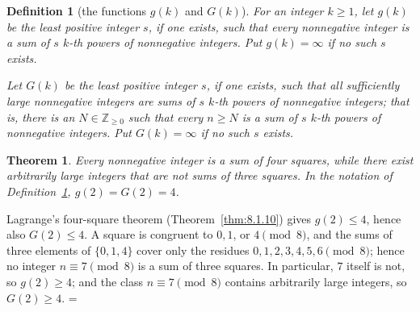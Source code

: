 \documentclass[11pt]{article}
\makeatletter
\theoremstyle{ntstyle}
\newtheorem{theorem}{Theorem}[subsection]
\newtheorem{definition}{Definition}[subsection]
\let\nt@closedisplay\]
\def\nt@guardedclose{\@ifnextchar\par{\nt@closeafterpar}{\@ifnextchar\end{\postdisplaypenalty\@M\nt@closedisplay}{\nt@closedisplay}}}
\def\nt@closeafterpar\par{\@ifnextchar\par{\nt@closeafterpar}{\@ifnextchar\end{\postdisplaypenalty\@M\nt@closedisplay\par}{\nt@closedisplay\par}}}
\renewenvironment{proof}[1][\proofname]{\par
  \pushQED{\qed}\normalfont\topsep\medskipamount\edef\nt@afterproof{\@endparpenalty=\the\@endparpenalty\relax}\@beginparpenalty\@M\@endparpenalty\@M\let\]\nt@guardedclose\trivlist\item[]\textit{#1\@addpunct{.}} \ignorespaces}{\ifvmode\addpenalty\@M\fi\popQED\nt@afterproof\endtrivlist\@endpefalse}
\makeatother
\begin{document}
\begin{definition}[the functions $g(k)$ and $G(k)$]
	\label{def:12.6.1} For an integer $k\ge1$,
	let $g(k)$ be the least positive integer $s$, if one exists, such that
	every nonnegative integer is a sum of $s$ $k$-th powers of
	nonnegative integers. Put $g(k)=\infty$ if no such $s$ exists.

	Let $G(k)$ be the least positive integer $s$, if one exists, such that
	all sufficiently large nonnegative integers are sums of $s$ $k$-th
	powers of nonnegative integers; that is, there is an $N\in\mathbb{Z}_{\ge0}$ such that every
	$n\ge N$ is a sum of $s$ $k$-th powers of nonnegative integers. Put $G(k)=\infty$ if no such $s$ exists.
\end{definition}
\begin{theorem}\label{thm:12.6.1} Every nonnegative integer is a
	sum of four squares, while there exist arbitrarily large integers
	that are not sums of three squares. In the notation of Definition~\ref{def:12.6.1},
		\mbox{$g(2)=G(2)=4$}.
\end{theorem}

\begin{proof} Lagrange's four-square theorem (Theorem~\ref{thm:8.1.10}) gives $g(2)\le4$, hence
also $G(2)\le4$. A square
	is congruent to $0, 1$, or $4\pmod{8}$, and the sums of three
	elements of $\{0, 1, 4\}$ cover only the residues $0, 1, 2, 3, 4, 5,
		6\pmod{8}$; hence no integer $n\equiv7\pmod{8}$ is a sum of three
	squares. In particular, $7$ itself is not, so $g(2)\ge4$; and the
	class $n\equiv7\pmod{8}$ contains arbitrarily large integers, so
	$G(2)\ge4$.
\end{proof}

\clearpage
{}
{}
\printindex
\end{document}
